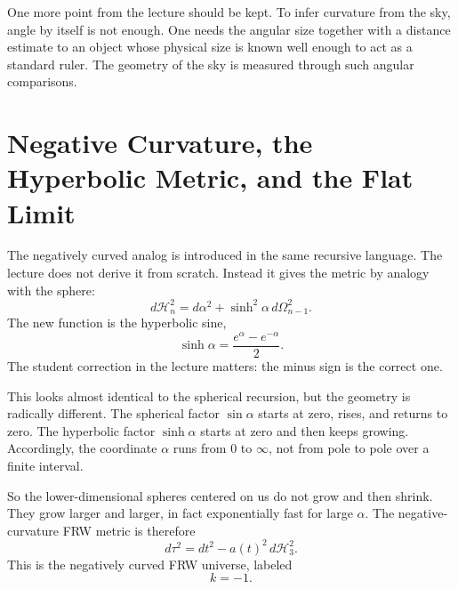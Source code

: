 One more point from the lecture should be kept. To infer curvature from the sky, angle by itself is not enough. One needs the angular size together with a distance estimate to an object whose physical size is known well enough to act as a standard ruler. The geometry of the sky is measured through such angular comparisons.

\section{Negative Curvature, the Hyperbolic Metric, and the Flat Limit}

The negatively curved analog is introduced in the same recursive language. The lecture does not derive it from scratch. Instead it gives the metric by analogy with the sphere:
\begin{equation}
d\mathcal H_n^2=d\alpha^2+\sinh^2\alpha\,d\Omega_{n-1}^2.
\end{equation}
The new function is the hyperbolic sine,
\begin{equation}
\sinh\alpha=\frac{e^\alpha-e^{-\alpha}}{2}.
\end{equation}
The student correction in the lecture matters: the minus sign is the correct one.

This looks almost identical to the spherical recursion, but the geometry is radically different. The spherical factor \(\sin\alpha\) starts at zero, rises, and returns to zero. The hyperbolic factor \(\sinh\alpha\) starts at zero and then keeps growing. Accordingly, the coordinate \(\alpha\) runs from \(0\) to \(\infty\), not from pole to pole over a finite interval.

So the lower-dimensional spheres centered on us do not grow and then shrink. They grow larger and larger, in fact exponentially fast for large \(\alpha\). The negative-curvature FRW metric is therefore
\begin{equation}
d\tau^2=dt^2-a(t)^2\,d\mathcal H_3^2.
\end{equation}
This is the negatively curved FRW universe, labeled
\begin{equation}
k=-1.
\end{equation}

